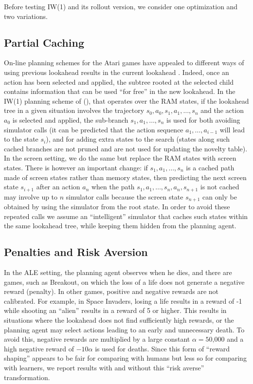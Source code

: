 \documentclass[letterpaper]{article}
\begin{document}
Before testing IW(1) and its rollout version, we consider one optimization and two variations.


\subsection{Partial Caching}

On-line planning schemes for the Atari games have appealed to different ways of using  previous lookahead results
in the current lookahead \cite{ale}. Indeed, once an action has been selected and applied, the subtree rooted
at the selected child contains information that can be used ``for free''  in the new lookahead.
In the IW(1) planning scheme of \citeauthor{nir:ijcai2015} (\citeyear{nir:ijcai2015}), that operates over
the RAM states, if the lookahead tree in a given situation involves the trajectory $s_0,a_0,s_1,a_1,\ldots,s_n$
and the action $a_0$ is selected and applied, the sub-branch $s_1,a_1, \ldots,s_n$ is used for both
avoiding simulator calls (it can be predicted that the action sequence $a_1,\ldots, a_{i-1}$ will lead to
the state $s_i$), and for adding extra states to the search (states along such cached branches are not
pruned and are not used for updating the novelty table).  In the screen setting, we do the same but replace
the RAM states with screen states. There is however an important change: if $s_1,a_1,\ldots,s_n$ is a cached
path made of screen states rather than memory states, then predicting the next screen state $s_{i+1}$
after an action $a_n$ when the path $s_1,a_1,\ldots,s_n,a_n,s_{n+1}$ is not cached may involve
up to $n$ simulator calls because the screen state $s_{n+1}$ can only be obtained by using
the simulator from the root state.
In order to avoid these repeated  calls we assume an ``intelligent'' simulator that caches such states within
the same lookahead tree, while keeping them hidden from the planning agent.

\subsection{Penalties and Risk Aversion}

In the ALE setting, the planning agent observes when he dies, and there are games, such as
Breakout, on which the loss of a life does not generate a negative reward (penalty).
In other games, positive and negative rewards are not calibrated. For example, in
Space Invaders, losing a life  results in a reward of -1 while shooting
an  ``alien'' results in  a reward  of 5 or higher. This results in  situations
where the lookahead does not find sufficiently high rewards, or the planning agent may select
actions leading to an early and unnecessary death. To avoid this,  negative rewards
are multiplied by a large constant $\alpha=\text{50,000}$ and a high negative reward  of $-10\alpha$ is
used for deaths.  Since this form of ``reward shaping'' appears to be fair for comparing with humans
but less so for comparing with learners, we report results with and without this ``risk averse'' transformation.
\end{document}
